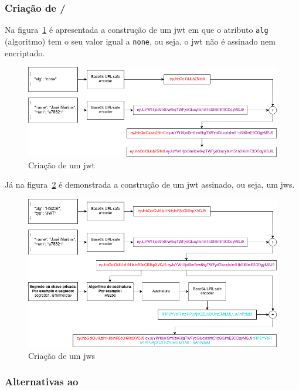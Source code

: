 \subsubsection{Criação de /}\label{sec:criacaojwt}

Na figura~\ref{fig:buildJWT} é apresentada a construção de um \acrshort{jwt} em que o atributo 
\texttt{alg} (algoritmo) tem o seu valor igual a \texttt{none}, ou seja, o \acrshort{jwt} não é 
assinado nem encriptado.

\begin{figure}[H]
    \centering
    \includegraphics[width=1\textwidth]{img/buildJWT.png}
    \caption{Criação de um \acrshort{jwt}}\label{fig:buildJWT}
\end{figure}

Já na figura~\ref{fig:buildJWS} é demonstrada a construção de um \acrshort{jwt} assinado, ou seja, um \acrshort{jws}.

\begin{figure}[H]
    \centering
    \includegraphics[width=1\textwidth]{img/buildJWS.png}
    \caption{Criação de um \acrshort{jws}}\label{fig:buildJWS}
\end{figure}

\subsubsection{Alternativas ao }

